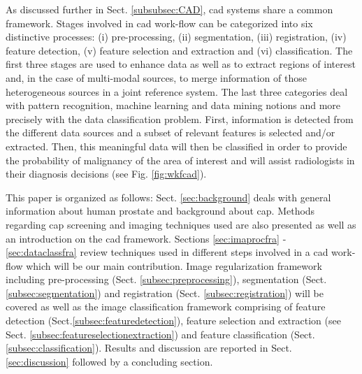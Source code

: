 As discussed further in Sect. \ref{subsubsec:CAD}, \acs{cad} systems share a common framework. Stages involved in \acs{cad} work-flow can be categorized into six distinctive processes: (i) pre-processing, (ii) segmentation, (iii) registration, (iv) feature detection, (v) feature selection and extraction and (vi) classification. The first three stages are used to enhance data as well as to extract regions of interest and, in the case of multi-modal sources, to merge information of those heterogeneous sources in a joint reference system. The last three categories deal with pattern recognition, machine learning and data mining notions and more precisely with the data classification problem. First, information is detected from the different data sources and a subset of relevant features is selected and/or extracted. Then, this meaningful data will then be classified in order to provide the probability of malignancy of the area of interest and will assist radiologists in their diagnosis decisions (see Fig. \ref{fig:wkfcad}).

This paper is organized as follows: Sect. \ref{sec:background} deals with general information about human prostate and background about \ac{cap}. Methods regarding \ac{cap} screening and imaging techniques used are also presented as well as an introduction on the \acs{cad} framework. Sections \ref{sec:imaprocfra} - \ref{sec:dataclassfra} review techniques used in different steps involved in a \acs{cad} work-flow which will be our main contribution. Image regularization framework including pre-processing (Sect. \ref{subsec:preprocessing}), segmentation (Sect. \ref{subsec:segmentation}) and registration (Sect. \ref{subsec:registration}) will be covered as well as the image classification framework comprising of feature detection (Sect.\ref{subsec:featuredetection}), feature selection and extraction (see Sect. \ref{subsec:featureselectionextraction}) and feature classification (Sect. \ref{subsec:classification}). Results and discussion are reported in Sect. \ref{sec:discussion} followed by a concluding section.